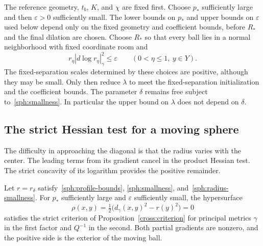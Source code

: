 \begin{remark}\label{sph:choices}
The reference geometry, $t_b$, $K$, and $\chi$ are fixed first.
Choose $p_*$ sufficiently large and then $\varepsilon>0$ sufficiently
small.  The lower bounds on $p_*$ and upper bounds on $\varepsilon$
used below depend only on the fixed geometry and coefficient bounds,
before $R_*$ and the final dilation are chosen.
Choose $R_*$ so that every ball lies in a normal neighborhood with
fixed coordinate room and
\begin{equation}\label{sph:radius-smallness}
 r_\eta|d\log r_\eta|_\gamma^2\le\varepsilon
 \qquad(0<\eta\le1,\ y\in Y).
\end{equation}
The fixed-separation scales determined by these choices are positive,
although they may be small.  Only then reduce $\lambda$ to meet the
fixed-separation initialization and the coefficient bounds.  The
parameter $\delta$ remains free subject to~\eqref{sph:smallness}.
In particular the upper bound on $\lambda$ does not depend on
$\delta$.
\end{remark}

\subsection{The strict Hessian test for a moving sphere}

The difficulty in approaching the diagonal is that the radius varies
with the center.  The leading terms from its gradient cancel in the
product Hessian test.  The strict concavity of its logarithm provides
the positive remainder.

\begin{lemma}\label{sph:strict}
Let $r=r_\delta$ satisfy~\eqref{sph:profile-bounds},
\eqref{sph:smallness}, and~\eqref{sph:radius-smallness}.
For $p_*$ sufficiently large and $\varepsilon$ sufficiently small,
the hypersurface
\[
 \rho(x,y)=\tfrac12\bigl(d_\gamma(x,y)^2-r(y)^2\bigr)=0
\]
satisfies the strict criterion of Proposition~\ref{cross:criterion}
for principal metrics $\gamma$ in the first factor and $Q^{-1}$ in
the second.  Both partial gradients are nonzero, and the positive
side is the exterior of the moving ball.
\end{lemma}


